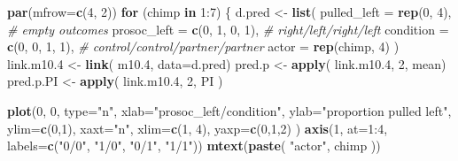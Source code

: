 \documentclass[]{tufte-handout}
\newenvironment{Shaded}{}{}
\newcommand{\KeywordTok}[1]{\textcolor[rgb]{0.00,0.44,0.13}{\textbf{#1}}}
\newcommand{\DataTypeTok}[1]{\textcolor[rgb]{0.56,0.13,0.00}{#1}}
\newcommand{\DecValTok}[1]{\textcolor[rgb]{0.25,0.63,0.44}{#1}}
\newcommand{\FloatTok}[1]{\textcolor[rgb]{0.25,0.63,0.44}{#1}}
\newcommand{\StringTok}[1]{\textcolor[rgb]{0.25,0.44,0.63}{#1}}
\newcommand{\CommentTok}[1]{\textcolor[rgb]{0.38,0.63,0.69}{\textit{#1}}}
\newcommand{\ControlFlowTok}[1]{\textcolor[rgb]{0.00,0.44,0.13}{\textbf{#1}}}
\newcommand{\OperatorTok}[1]{\textcolor[rgb]{0.40,0.40,0.40}{#1}}
\newcommand{\NormalTok}[1]{#1}
\begin{document}
\begin{Shaded}
\begin{Highlighting}[]
\KeywordTok{par}\NormalTok{(}\DataTypeTok{mfrow=}\KeywordTok{c}\NormalTok{(}\DecValTok{4}\NormalTok{, }\DecValTok{2}\NormalTok{))}
\ControlFlowTok{for}\NormalTok{ (chimp }\ControlFlowTok{in} \DecValTok{1}\OperatorTok{:}\DecValTok{7}\NormalTok{) \{}
\NormalTok{  d.pred <-}\StringTok{ }\KeywordTok{list}\NormalTok{(}
    \DataTypeTok{pulled_left =} \KeywordTok{rep}\NormalTok{(}\DecValTok{0}\NormalTok{, }\DecValTok{4}\NormalTok{),       }\CommentTok{# empty outcomes}
    \DataTypeTok{prosoc_left =} \KeywordTok{c}\NormalTok{(}\DecValTok{0}\NormalTok{, }\DecValTok{1}\NormalTok{, }\DecValTok{0}\NormalTok{, }\DecValTok{1}\NormalTok{),   }\CommentTok{# right/left/right/left}
    \DataTypeTok{condition =} \KeywordTok{c}\NormalTok{(}\DecValTok{0}\NormalTok{, }\DecValTok{0}\NormalTok{, }\DecValTok{1}\NormalTok{, }\DecValTok{1}\NormalTok{),     }\CommentTok{# control/control/partner/partner}
    \DataTypeTok{actor =} \KeywordTok{rep}\NormalTok{(chimp, }\DecValTok{4}\NormalTok{)}
\NormalTok{  )}
\NormalTok{  link.m10}\FloatTok{.4}\NormalTok{ <-}\StringTok{ }\KeywordTok{link}\NormalTok{( m10}\FloatTok{.4}\NormalTok{, }\DataTypeTok{data=}\NormalTok{d.pred)}
\NormalTok{  pred.p <-}\StringTok{ }\KeywordTok{apply}\NormalTok{( link.m10}\FloatTok{.4}\NormalTok{, }\DecValTok{2}\NormalTok{, mean)}
\NormalTok{  pred.p.PI <-}\StringTok{ }\KeywordTok{apply}\NormalTok{( link.m10}\FloatTok{.4}\NormalTok{, }\DecValTok{2}\NormalTok{, PI )}
  
  \KeywordTok{plot}\NormalTok{(}\DecValTok{0}\NormalTok{, }\DecValTok{0}\NormalTok{, }\DataTypeTok{type=}\StringTok{"n"}\NormalTok{, }\DataTypeTok{xlab=}\StringTok{"prosoc_left/condition"}\NormalTok{,}
       \DataTypeTok{ylab=}\StringTok{"proportion pulled left"}\NormalTok{,}
       \DataTypeTok{ylim=}\KeywordTok{c}\NormalTok{(}\DecValTok{0}\NormalTok{,}\DecValTok{1}\NormalTok{), }\DataTypeTok{xaxt=}\StringTok{"n"}\NormalTok{,}
       \DataTypeTok{xlim=}\KeywordTok{c}\NormalTok{(}\DecValTok{1}\NormalTok{, }\DecValTok{4}\NormalTok{), }\DataTypeTok{yaxp=}\KeywordTok{c}\NormalTok{(}\DecValTok{0}\NormalTok{,}\DecValTok{1}\NormalTok{,}\DecValTok{2}\NormalTok{) )}
  \KeywordTok{axis}\NormalTok{(}\DecValTok{1}\NormalTok{, }\DataTypeTok{at=}\DecValTok{1}\OperatorTok{:}\DecValTok{4}\NormalTok{, }\DataTypeTok{labels=}\KeywordTok{c}\NormalTok{(}\StringTok{"0/0"}\NormalTok{, }\StringTok{"1/0"}\NormalTok{, }\StringTok{"0/1"}\NormalTok{, }\StringTok{"1/1"}\NormalTok{))}
  \KeywordTok{mtext}\NormalTok{(}\KeywordTok{paste}\NormalTok{( }\StringTok{"actor"}\NormalTok{, chimp ))}
  

\end{Highlighting}
\end{Shaded}
\end{document}
